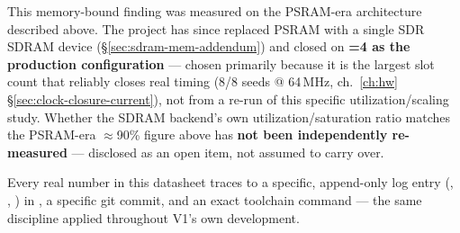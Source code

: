 \begin{fnwarn}
This memory-bound finding was measured on the PSRAM-era architecture
described above. The project has since replaced PSRAM with a single
SDR SDRAM device (\S\ref{sec:sdram-mem-addendum}) and closed on
\textbf{=4 as the production configuration} --- chosen
primarily because it is the largest slot count that reliably closes
real timing (8/8 seeds @ 64\,MHz, ch.~\ref{ch:hw}
\S\ref{sec:clock-closure-current}), not from a re-run of this specific
utilization/scaling study. Whether the SDRAM backend's own
utilization/saturation ratio matches the PSRAM-era $\approx$90\% figure
above has \textbf{not been independently re-measured} --- disclosed as
an open item, not assumed to carry over.
\end{fnwarn}

\begin{fnnote}[Reproducibility]
Every real number in this datasheet traces to a specific, append-only
log entry (, ,
) in , a specific git
commit, and an exact toolchain command --- the same discipline applied
throughout V1's own development.
\end{fnnote}

